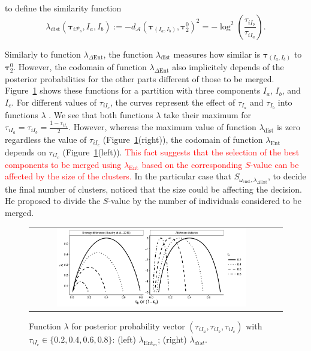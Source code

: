\documentclass[submit]{smj}
\theoremstyle{definition}
\newcommand{\m}[1]{\boldsymbol{#1}}
\begin{document}
 to define the similarity function
\[
\lambda_{\text{dist}}(\m\tau_{i \mathcal{P}_s},  I_a,  I_b) := -d_\mathcal{A}\left(\m\tau_{\left(I_a, I_b\right)}, \m\tau_2^0 \right)^2 = -\log^2 \left(\frac{ \tau_{iI_b} }{ \tau_{iI_a} }\right).
\]



Similarly to function $\lambda_{\Delta\text{Ent}}$, the function $\lambda_{\text{dist}}$  measures how similar is $\m\tau_{\left(I_a, I_b\right)}$ to $\m\tau_2^0$. However, the codomain of function $\lambda_{\Delta\text{Ent}}$ also implicitely depends of the posterior probabilities for the other parts different of those to be merged. Figure~\ref{symetric} shows these functions for a partition with three components $I_a$, $I_b$, and $I_c$. For different values of $\tau_{iI_c}$, the curves represent the effect of $\tau_{I_a}$ and $\tau_{I_b}$ into functions $\lambda$ . We see that both functions $\lambda$ take their maximum for $\tau_{iI_a}=\tau_{iI_b}=\frac{1-\tau_{i I_c}}{2}$. However, whereas the maximum value of function $\lambda_{\text{dist}}$ is zero regardless the value of $\tau_{iI_c}$ (Figure~\ref{symetric}(right)), the codomain of function $\lambda_{\text{Ent}}$ depends on $\tau_{iI_c}$ (Figure~\ref{symetric}(left)). \textcolor{red}{This fact suggests that the selection of the best components to be merged using $\lambda_{\text{Ent}}$ based on the corresponding $S$-value can be affected by the size of the clusters.} \textcolor{black!80!green}{In the particular case that $S_{\omega_{\text{cnst}}, \lambda_{\Delta \text{Ent}}}$, to decide the final number of clusters, \cite{baudry2010combining} noticed that the size could be affecting the decision. He proposed to divide the $S$-value by the number of individuals considered to be merged.}

\begin{figure}[htpb]
\begin{center}
\begin{tabular}{cc}
  \includegraphics[width=0.8\textwidth]{figures/entr_dist.pdf} \\
 \end{tabular}
 \caption{Function $\lambda$ for posterior probability 
vector $\left(\tau_{iI_a}, \tau_{iI_b}, \tau_{iI_c} \right)$ with $\tau_{iI_c} \in \{0.2, 0.4, 0.6, 0.8\}$: (left) $\lambda_{\text{Ent}_m}$; (right) $\lambda_{dist}$.} 
\label{symetric}
\end{center}
\end{figure}
\end{document}
